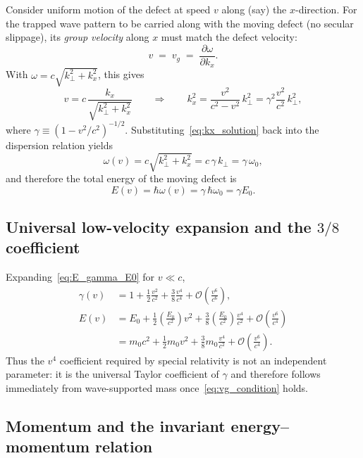 \documentclass[11pt]{article}
\begin{document}
Consider uniform motion of the defect at speed $v$ along (say) the $x$-direction. For the trapped wave pattern to be carried along with the moving defect (no secular slippage), its \emph{group velocity} along $x$ must match the defect velocity:
\begin{equation}
v \;=\; v_g \;=\; \frac{\partial \omega}{\partial k_x}.
\label{eq:vg_condition}
\end{equation}
With $\omega = c\sqrt{k_\perp^2 + k_x^2}$, this gives
\begin{equation}
v
= c\,\frac{k_x}{\sqrt{k_\perp^2+k_x^2}}
\qquad \Longrightarrow \qquad
k_x^2 = \frac{v^2}{c^2-v^2}\,k_\perp^2
= \gamma^2\frac{v^2}{c^2}\,k_\perp^2,
\label{eq:kx_solution}
\end{equation}
where $\gamma \equiv (1-v^2/c^2)^{-1/2}$. Substituting~\eqref{eq:kx_solution} back into the dispersion relation yields
\begin{equation}
\omega(v) = c\sqrt{k_\perp^2+k_x^2}
= c\,\gamma\,k_\perp
= \gamma\,\omega_0,
\end{equation}
and therefore the total energy of the moving defect is
\begin{equation}
E(v) = \hbar\omega(v) = \gamma\,\hbar\omega_0 = \gamma E_0.
\label{eq:E_gamma_E0}
\end{equation}

\subsection{Universal low-velocity expansion and the $3/8$ coefficient}

Expanding~\eqref{eq:E_gamma_E0} for $v\ll c$,
\begin{align}
\gamma(v)
&= 1 + \frac{1}{2}\frac{v^2}{c^2} + \frac{3}{8}\frac{v^4}{c^4} + \mathcal O\!\left(\frac{v^6}{c^6}\right),
\\[4pt]
E(v)
&= E_0
+ \frac{1}{2}\left(\frac{E_0}{c^2}\right)v^2
+ \frac{3}{8}\left(\frac{E_0}{c^2}\right)\frac{v^4}{c^2}
+ \mathcal O\!\left(\frac{v^6}{c^4}\right)
\nonumber\\
&= m_0c^2 + \frac{1}{2}m_0 v^2 + \frac{3}{8}m_0\frac{v^4}{c^2}
+ \mathcal O\!\left(\frac{v^6}{c^4}\right).
\label{eq:E_series}
\end{align}
Thus the $v^4$ coefficient required by special relativity is not an independent parameter: it is the universal Taylor coefficient of $\gamma$ and therefore follows immediately from wave-supported mass once~\eqref{eq:vg_condition} holds.

\subsection{Momentum and the invariant energy--momentum relation}
\end{document}
